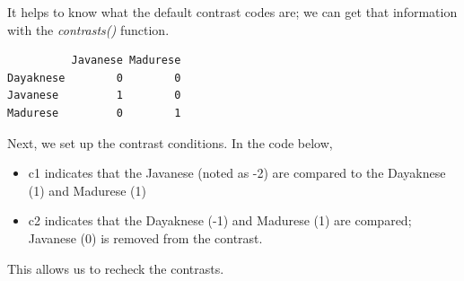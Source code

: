 \documentclass[
  11pt,
]{book}
\newenvironment{Shaded}{\begin{snugshade}}{\end{snugshade}}
\newcommand{\CommentTok}[1]{\textcolor[rgb]{0.37,0.37,0.37}{\textit{#1}}}
\newcommand{\DecValTok}[1]{\textcolor[rgb]{0.06,0.06,0.06}{#1}}
\newcommand{\FunctionTok}[1]{\textcolor[rgb]{0.27,0.27,0.27}{\textbf{#1}}}
\newcommand{\NormalTok}[1]{#1}
\newcommand{\OtherTok}[1]{\textcolor[rgb]{0.37,0.37,0.37}{#1}}
\newcommand{\SpecialCharTok}[1]{\textcolor[rgb]{0.43,0.43,0.43}{\textbf{#1}}}
\providecommand{\tightlist}{%
  \setlength{\itemsep}{0pt}\setlength{\parskip}{0pt}}
\begin{document}
It helps to know what the default contrast codes are; we can get that information with the \emph{contrasts()} function.

\begin{Shaded}
\end{Shaded}

\begin{verbatim}
          Javanese Madurese
Dayaknese        0        0
Javanese         1        0
Madurese         0        1
\end{verbatim}

Next, we set up the contrast conditions. In the code below,

\begin{itemize}
\tightlist
\item
  c1 indicates that the Javanese (noted as -2) are compared to the Dayaknese (1) and Madurese (1)
\item
  c2 indicates that the Dayaknese (-1) and Madurese (1) are compared; Javanese (0) is removed from the contrast.
\end{itemize}

\begin{Shaded}
\end{Shaded}

This allows us to recheck the contrasts.

\begin{Shaded}
\end{Shaded}
\end{document}
